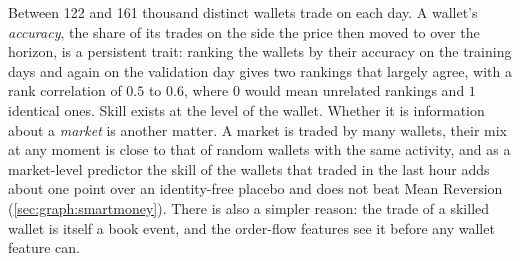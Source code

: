 Between 122 and 161 thousand distinct wallets trade on each day.  A wallet's
\emph{accuracy}, the share of its trades on the side the price then moved to over the
horizon, is a persistent trait: ranking the wallets by their accuracy on the training days
and again on the validation day gives two rankings that largely agree, with a rank
correlation of $0.5$ to $0.6$, where $0$ would mean unrelated rankings and $1$ identical
ones.  Skill exists at the level of the wallet.  Whether it is information about a
\emph{market} is another matter.  A market is traded by many wallets, their mix at any
moment is close to that of random wallets with the same activity, and as a market-level
predictor the skill of the wallets that traded in the last hour adds about one point over
an identity-free placebo and does not beat Mean Reversion (\cref{sec:graph:smartmoney}).
There is also a simpler reason: the trade of a skilled wallet is itself a book event, and
the order-flow features see it before any wallet feature can.
